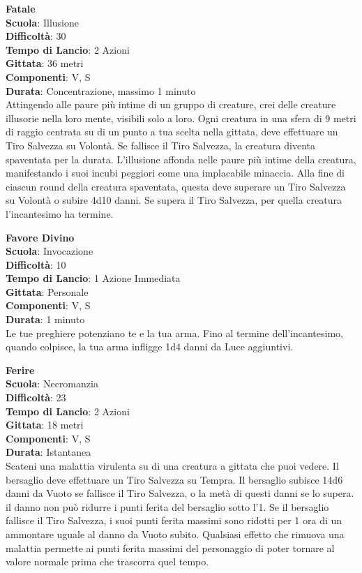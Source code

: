 \begin{multicols}{2}
\medskip\textbf{Fatale}\\
\textbf{Scuola}: Illusione\\
\textbf{Difficoltà}:  30\\
\textbf{Tempo di Lancio}: 2 Azioni\\
\textbf{Gittata}: 36 metri\\
\textbf{Componenti}: V, S\\
\textbf{Durata}: Concentrazione, massimo 1 minuto\\
Attingendo alle paure più intime di un gruppo di creature, crei delle creature illusorie nella loro mente, visibili solo a loro. Ogni creatura in una sfera di 9 metri di raggio centrata su di un punto a tua scelta nella gittata, deve effettuare un Tiro Salvezza su Volontà. Se fallisce il Tiro Salvezza, la creatura diventa spaventata per la durata. L’illusione affonda nelle paure più intime della creatura, manifestando i suoi incubi peggiori come una implacabile minaccia. Alla fine di ciascun round della creatura spaventata, questa deve superare un Tiro Salvezza su Volontà o subire 4d10 danni. Se supera il Tiro Salvezza, per quella creatura l'incantesimo ha termine.

\medskip\textbf{Favore Divino}\\
\textbf{Scuola}: Invocazione\\
\textbf{Difficoltà}:  10\\
\textbf{Tempo di Lancio}: 1 Azione Immediata\\
\textbf{Gittata}: Personale\\
\textbf{Componenti}: V, S\\
\textbf{Durata}: 1 minuto\\
Le tue preghiere potenziano te e la tua arma. Fino al termine dell'incantesimo, quando colpisce, la tua arma infligge 1d4 danni da Luce aggiuntivi.

\medskip\textbf{Ferire}\\
\textbf{Scuola}: Necromanzia\\
\textbf{Difficoltà}:  23\\
\textbf{Tempo di Lancio}: 2 Azioni\\
\textbf{Gittata}: 18 metri\\
\textbf{Componenti}: V, S\\
\textbf{Durata}: Istantanea\\
Scateni una malattia virulenta su di una creatura a gittata che puoi vedere. Il bersaglio deve effettuare un Tiro Salvezza su Tempra. Il bersaglio subisce 14d6 danni da Vuoto se fallisce il Tiro Salvezza, o la metà di questi danni se lo supera. il danno non può ridurre i punti ferita del bersaglio sotto l’1. Se il bersaglio fallisce il Tiro Salvezza, i suoi punti ferita massimi sono ridotti per 1 ora di un ammontare uguale al danno da Vuoto subito. Qualsiasi effetto che rimuova una malattia permette ai punti ferita massimi del personaggio di poter tornare al valore normale prima che trascorra quel tempo.


\end{multicols}
